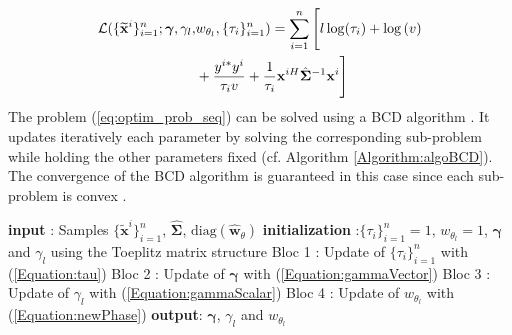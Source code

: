     \vspace{-0.2cm}
    \begin{align}
        \mathcal{L}(\{\mathbf{\widetilde{x}}^i\}_{i=1}^n; \boldsymbol{\gamma}, \gamma_{l}, &w_{\theta_{l}}, \{\tau_i\}_{i=1}^n) = \sum_{i=1}^n \Bigg[ l \log(\tau_i) + \log\left( v \right) \notag \\
        &+ \frac{y^{i*} y^i}{\tau_i v} + \frac{1}{\tau_i} \mathbf{x}^{iH} \hat{\mathbf{\Sigma}}^{-1} \mathbf{x}^i \Bigg] \label{log_likelihood_eq_final}
    \end{align}
    The problem (\ref{eq:optim_prob_seq}) can be solved using a \acs{BCD} algorithm \citep{hong2015unified}. It  updates iteratively each parameter by solving the corresponding sub-problem while holding the other parameters fixed (cf. Algorithm \ref{Algorithm:algoBCD}). %
    The convergence of the BCD algorithm is guaranteed in this case since each sub-problem is convex \citep{razaviyayn2013unified, hong2015unified}.%
    \vspace{-0.1cm}
    \begin{algorithm}
        \caption{ \normalsize \ac{BCD} algorithm }
        \label{Algorithm:algoBCD}
        \begin{algorithmic}
            \State \normalsize \fontsize{10}{12}\selectfont \textbf{input} : Samples $\{\mathbf{\widetilde{x}}^i\}_{i=1}^n$, $\hat{\mathbf{\Sigma}}$, $\text{diag}(\hat{\mathbf{w}}_{\theta})$
            \State \normalsize \fontsize{10}{12}\selectfont \textbf{initialization} :$\{\tau_i\}_{i=1}^n = 1$, $w_{\theta_{l}} = 1$, $\boldsymbol{\gamma}$ and $\gamma_{l}$ using the Toeplitz matrix structure
            \Repeat
                \State \normalsize \fontsize{10}{12}\selectfont Bloc 1 : Update of $\{\tau_i\}_{i=1}^n$ with (\ref{Equation:tau})
                \State \normalsize \fontsize{10}{12}\selectfont Bloc 2 : Update of $\boldsymbol{\gamma}$ with (\ref{Equation:gammaVector})
                \State \normalsize \fontsize{10}{12}\selectfont  Bloc 3 : Update of $\gamma_{l}$ with (\ref{Equation:gammaScalar})
                \State \normalsize \fontsize{10}{12}\selectfont Bloc 4 : Update of $w_{\theta_{l}}$ with (\ref{Equation:newPhase})
            \State \normalsize \fontsize{10}{12}\selectfont  \textbf{output}: $\boldsymbol{\gamma}$, $\gamma_{l}$ and $w_{\theta_{l}}$
        \end{algorithmic}
    \end{algorithm}
    
